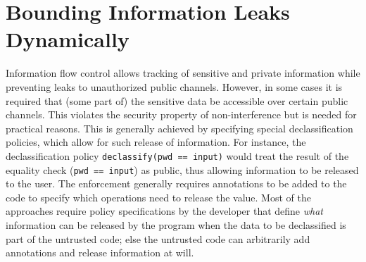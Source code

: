 \chapter{Bounding Information Leaks Dynamically}
\label{ch:lir}

Information flow control allows tracking of sensitive and private
information while preventing leaks to unauthorized public 
channels. However, in some cases it is required that (some part of) 
the sensitive data be accessible over certain public channels. This
violates the security property of non-interference but is needed for  
practical reasons. This is generally achieved by specifying special
declassification policies, which allow for such release of
information. For instance, the declassification policy 
\lstinline{declassify(pwd == input)} would treat the result of the
equality check (\lstinline{pwd == input})  as public, thus allowing
information to be released to the user. The enforcement generally
requires  annotations to be added to the code to
specify which operations need to release the value. Most of the
approaches require policy specifications by the developer that define
\emph{what} information can be released by the program when the data
to be declassified is part of the untrusted code; else the untrusted
code can arbitrarily add  annotations and release
information at will. 



